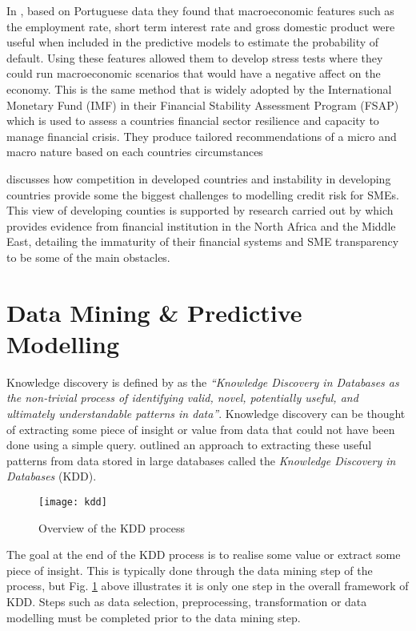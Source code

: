 In \cite{antunes_estimating_2005}, based on Portuguese data they found that macroeconomic features such as the employment rate, short term interest rate and gross domestic product were useful when included in the predictive models to estimate the probability of default. Using these features allowed them to develop stress tests where they could run macroeconomic scenarios that would have a negative affect on the economy. This is the same method that is widely adopted by the International Monetary Fund (IMF) in their Financial Stability Assessment Program (FSAP) which is used to assess a countries financial sector resilience and capacity to manage financial crisis. They produce tailored recommendations of a micro and macro nature based on each countries circumstances \citep{marston_financial_2001} 

\cite{ardic_small_2011} discusses how competition in developed countries and instability in developing countries provide some the biggest challenges to modelling credit risk for SMEs. This view of developing counties is supported by research carried out by \cite{rocha_status_2011} which provides evidence from financial institution in the North Africa and the Middle East, detailing the immaturity of their financial systems and SME transparency to be some of the main obstacles. 


\section{Data Mining \& Predictive Modelling}\label{sec:dataMining}
Knowledge discovery is defined by \cite{frawley_knowledge_1992} as the \textit{``Knowledge Discovery in Databases as the non-trivial process of identifying valid, novel, potentially useful, and ultimately understandable patterns in data''}. Knowledge discovery can be thought of extracting some piece of insight or value from data that could not have been done using a simple query. \cite{fayyad_knowledge_1996} outlined an approach to extracting these useful patterns from data stored in large databases called the \textit{Knowledge Discovery in Databases} (KDD).

\begin{figure}[H]
	\texttt{[image: kdd]}
	\caption{Overview of the KDD process  \\
		\cite[Source:][]{fayyad_knowledge_1996}		
	}
	\label{fig:kdd}
\end{figure}

The goal at the end of the KDD process is to realise some value or extract some piece of insight. This is typically done through the data mining step of the process, but Fig. \ref{fig:kdd} above illustrates it is only one step in the overall framework of KDD. Steps such as data selection, preprocessing, transformation or data modelling must be completed prior to the data mining step. 


